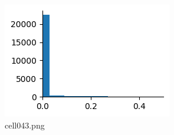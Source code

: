 \begin{figure}[ht]
	\centering
	\includegraphics[scale=0.8, max width=\linewidth]{./fig/energy-based-model/sparse-coding/cell043.png}
	\caption{cell043.png}
	\label{cell043.png}
\end{figure}